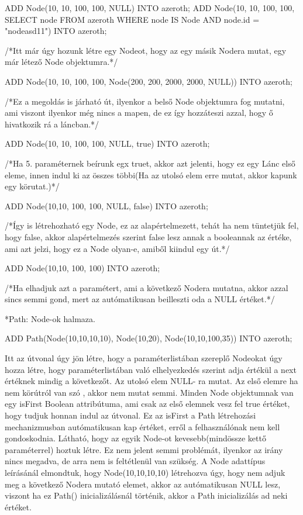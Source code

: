 \begin{sql}
ADD Node(10, 10, 100, 100, NULL) INTO azeroth;
ADD Node(10, 10, 100, 100, SELECT node FROM azeroth WHERE node IS Node AND node.id = "nodeasd11") INTO azeroth;
\end{sql}
/*Itt már úgy hozunk létre egy Nodeot, hogy az egy másik Nodera mutat, egy már létező Node objektumra.*/
\begin{sql}
ADD Node(10, 10, 100, 100, Node(200, 200, 2000, 2000, NULL)) INTO azeroth;
\end{sql}
/*Ez a megoldás is járható út, ilyenkor a belső Node objektumra fog mutatni, ami viszont ilyenkor még nincs a mapen, de ez így hozzáteszi azzal, hogy ő hivatkozik rá a láncban.*/
\begin{sql}
ADD Node(10, 10, 100, 100, NULL, true) INTO azeroth;
\end{sql}
/*Ha 5. paraméternek beírunk egx truet, akkor azt jelenti, hogy ez egy Lánc első eleme, innen indul ki az összes többi(Ha az utolsó elem erre mutat, akkor kapunk egy körutat.)*/
\begin{sql}
ADD Node(10,10, 100, 100, NULL, false) INTO azeroth;
\end{sql}
/*Így is létrehozható egy Node, ez az alapértelmezett, tehát ha nem tüntetjük fel, hogy false, akkor alapértelmezés szerint false lesz annak a booleannak az értéke, ami azt jelzi, hogy ez a Node olyan-e, amiből kiindul egy út.*/
\begin{sql}
ADD Node(10,10, 100, 100) INTO azeroth;
\end{sql}
/*Ha elhadjuk azt a paramétert, ami a következő Nodera mutatna, akkor azzal sincs semmi gond, mert az autómatikusan beilleszti oda a NULL értéket.*/

*Path: Node-ok halmaza.

\begin{sql}
ADD Path(Node(10,10,10,10), Node(10,20), Node(10,10,100,35)) INTO azeroth;
\end{sql}

Itt az útvonal úgy jön létre, hogy a paraméterlistában szereplő Nodeokat úgy hozza létre, hogy paraméterlistában való elhelyezkedés szerint adja értékül a next értéknek mindig a következőt. Az utolsó elem NULL- ra mutat. Az első elemre ha nem körútról van szó , akkor nem mutat semmi. Minden Node objektumnak van egy isFirst Boolean attribútuma, ami csak az első elemnek vesz fel true értéket, hogy tudjuk honnan indul az útvonal. Ez az isFirst a Path létrehozási mechanizmusban autómatikusan kap értéket, erről a felhasználónak nem kell gondoskodnia.
Látható, hogy az egyik Node-ot kevesebb(mindössze kettő paraméterrel) hoztuk létre. Ez nem jelent semmi problémát, ilyenkor az irány nincs megadva, de arra nem is feltétlenül van szükség.
A Node adattípus leírásánál elmondtuk, hogy Node(10,10,10,10) létrehozva úgy, hogy nem adjuk meg a következő Nodera mutató elemet, akkor az autómatikusan NULL lesz, viszont ha ez Path() inicializálásnál történik, akkor a Path inicializálás ad neki értéket.


